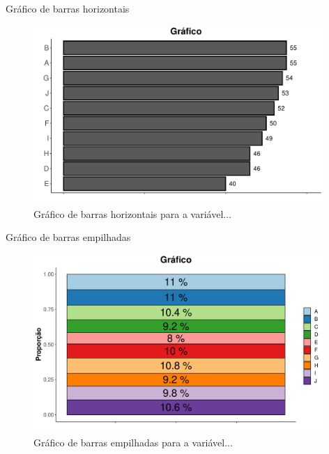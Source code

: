 \documentclass[
  ignorenonframetext,
  serif,
  professionalfont,
  usenames,
  dvipsnames,
  aspectratio = 169]{beamer}
\begin{document}
\begin{frame}{Gráfico de barras horizontais}
\protect\hypertarget{gruxe1fico-de-barras-horizontais}{}
\begin{figure}

{\centering \includegraphics[width=11cm]{200-exploratoria-uni-tabelas-graficos_files/figure-beamer/unnamed-chunk-13-1} 

}

\caption{Gráfico de barras horizontais para a variável...}\label{fig:unnamed-chunk-13}
\end{figure}
\end{frame}

\begin{frame}{Gráfico de barras empilhadas}
\protect\hypertarget{gruxe1fico-de-barras-empilhadas}{}
\begin{figure}

{\centering \includegraphics[width=11cm]{200-exploratoria-uni-tabelas-graficos_files/figure-beamer/unnamed-chunk-14-1} 

}

\caption{Gráfico de barras empilhadas para a variável...}\label{fig:unnamed-chunk-14}
\end{figure}
\end{frame}
\end{document}

